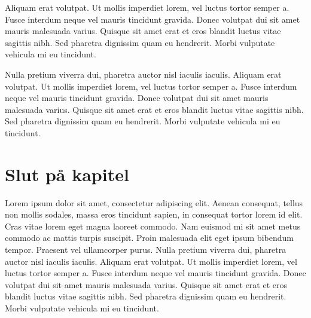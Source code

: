 \documentclass[11pt,a4paper]{article}
\begin{document}
Aliquam erat volutpat. Ut mollis imperdiet lorem, vel luctus tortor
semper a. Fusce interdum neque vel mauris tincidunt gravida. Donec
volutpat dui sit amet mauris malesuada varius. Quisque sit amet erat
et eros blandit luctus vitae sagittis nibh. Sed pharetra dignissim
quam eu hendrerit. Morbi vulputate vehicula mi eu tincidunt.

Nulla pretium viverra dui, pharetra auctor nisl iaculis
iaculis. Aliquam erat volutpat. Ut mollis imperdiet lorem, vel luctus
tortor semper a. Fusce interdum neque vel mauris tincidunt
gravida. Donec volutpat dui sit amet mauris malesuada varius. Quisque
sit amet erat et eros blandit luctus vitae sagittis nibh. Sed pharetra
dignissim quam eu hendrerit. Morbi vulputate vehicula mi eu tincidunt.

\newpage
\section{Slut på kapitel}
Lorem ipsum dolor sit amet, consectetur adipiscing elit. Aenean
consequat, tellus non mollis sodales, massa eros tincidunt sapien, in
consequat tortor lorem id elit. Cras vitae lorem eget magna laoreet
commodo. Nam euismod mi sit amet metus commodo ac mattis turpis
suscipit. Proin malesuada elit eget ipsum bibendum tempor. Praesent
vel ullamcorper purus. Nulla pretium viverra dui, pharetra auctor nisl
iaculis iaculis. Aliquam erat volutpat. Ut mollis imperdiet lorem, vel
luctus tortor semper a. Fusce interdum neque vel mauris tincidunt
gravida. Donec volutpat dui sit amet mauris malesuada varius. Quisque
sit amet erat et eros blandit luctus vitae sagittis nibh. Sed pharetra
dignissim quam eu hendrerit. Morbi vulputate vehicula mi eu tincidunt.
\end{document}
